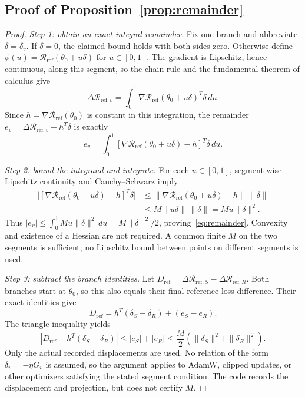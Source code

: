 \subsection{Proof of Proposition~\ref{prop:remainder}}
\begin{proof}
\textit{Step 1: obtain an exact integral remainder.}
Fix one branch and abbreviate $\delta=\delta_v$. If $\delta=0$, the
claimed bound holds with both sides zero. Otherwise define
$\phi(u)=\mathcal R_{\mathrm{ref}}(\theta_0+u\delta)$ for $u\in[0,1]$.
The gradient is Lipschitz, hence continuous, along this segment, so the
chain rule and the fundamental theorem of calculus give
\[
 \Delta\mathcal R_{\mathrm{ref},v}
 =\int_0^1\nabla\mathcal R_{\mathrm{ref}}(\theta_0+u\delta)^T\delta\,du.
\]
Since $h=\nabla\mathcal R_{\mathrm{ref}}(\theta_0)$ is constant in this
integration, the remainder $e_v=\Delta\mathcal R_{\mathrm{ref},v}-h^T\delta$
is exactly
\[
 e_v=\int_0^1
 [\nabla\mathcal R_{\mathrm{ref}}(\theta_0+u\delta)-h]^T\delta\,du.
\]

\textit{Step 2: bound the integrand and integrate.}
For each $u\in[0,1]$, segment-wise Lipschitz continuity and
Cauchy--Schwarz imply
\begin{align*}
 \big|[\nabla\mathcal R_{\mathrm{ref}}(\theta_0+u\delta)-h]^T\delta\big|
 &\leq\|\nabla\mathcal R_{\mathrm{ref}}(\theta_0+u\delta)-h\|\,\|\delta\|\\
 &\leq M\|u\delta\|\,\|\delta\|=Mu\|\delta\|^2.
\end{align*}
Thus $|e_v|\leq\int_0^1 Mu\|\delta\|^2\,du=M\|\delta\|^2/2$,
proving~\eqref{eq:remainder}. Convexity and existence of a Hessian are
not required. A common finite $M$ on the two segments is sufficient;
no Lipschitz bound between points on different segments is used.

\textit{Step 3: subtract the branch identities.}
Let $D_{\mathrm{ref}}=\Delta\mathcal R_{\mathrm{ref},S}
                         -\Delta\mathcal R_{\mathrm{ref},R}$.
Both branches start at $\theta_0$, so this also equals their final
reference-loss difference. Their exact identities give
\[
 D_{\mathrm{ref}}=h^T(\delta_S-\delta_R)+(e_S-e_R).
\]
The triangle inequality yields
\[
 |D_{\mathrm{ref}}-h^T(\delta_S-\delta_R)|
 \leq|e_S|+|e_R|
 \leq\frac M2(\|\delta_S\|^2+\|\delta_R\|^2).
\]
Only the actual recorded displacements are used. No relation of the form
$\delta_v=-\eta G_v$ is assumed, so the argument applies to AdamW,
clipped updates, or other optimizers satisfying the stated segment condition.
The code records the displacement and projection, but does not certify $M$.
\end{proof}

